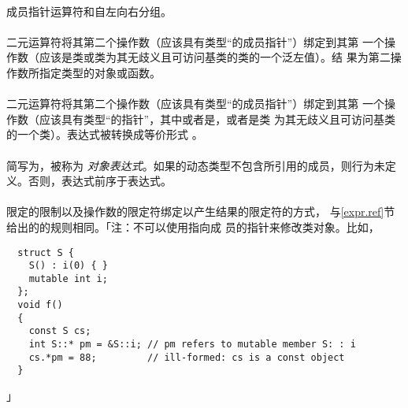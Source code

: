 \paragraph{}
成员指针运算符\tm{->*}和自左向右分组。


\paragraph{}
二元运算符将其第二个操作数（应该具有类型``的成员指针''）绑定到其第
一个操作数（应该是类或类为其无歧义且可访问基类的类的一个泛左值）。结
果为第二操作数所指定类型的对象或函数。

\paragraph{}
二元运算符\tm{->*}将其第二个操作数（应该具有类型``的成员指针''）绑定到其第
一个操作数（应该具有类型``的指针''，其中或者是，或者是类
为其无歧义且可访问基类的一个类）。表达式被转换成等价形式
。

\paragraph{}
简写为，被称为
\textit{对象表达式}。如果的动态类型不包含所引用的成员，则行为未定
义。否则，表达式前序于表达式。

\paragraph{}
限定的限制以及操作数的限定符绑定以产生结果的限定符的方式，
与\ref{expr.ref}节给出的的规则相同。「注：不可以使用指向成
员的指针来修改类对象。比如，
\begin{lstlisting}
  struct S {
    S() : i(0) { }
    mutable int i;
  };
  void f()
  {
    const S cs;
    int S::* pm = &S::i; // pm refers to mutable member S: : i
    cs.*pm = 88;         // ill-formed: cs is a const object
  }
\end{lstlisting}」

